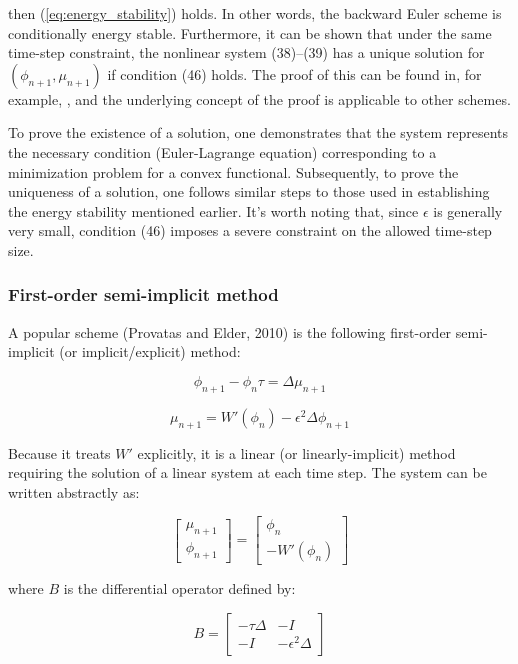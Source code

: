 \documentclass{article}
\begin{document}
then (\ref{eq:energy_stability}) holds. In other words, the backward Euler scheme is conditionally energy stable.
Furthermore, it can be shown that under the same time-step constraint, the nonlinear system (38)--(39) has a unique solution for $(\phi_{n+1}, \mu_{n+1})$ if condition (46) holds. The proof of this can be found in, for example, \cite{Elliott1989}, and the underlying concept of the proof is applicable to other schemes.

To prove the existence of a solution, one demonstrates that the system represents the necessary condition (Euler-Lagrange equation) corresponding to a minimization problem for a convex functional. Subsequently, to prove the uniqueness of a solution, one follows similar steps to those used in establishing the energy stability mentioned earlier. It's worth noting that, since $\epsilon$ is generally very small, condition (46) imposes a severe constraint on the allowed time-step size.
\subsubsection{First-order semi-implicit method}
A popular scheme (Provatas and Elder, 2010) is the following first-order semi-implicit (or implicit/explicit) method:

\begin{equation}
\phi_{n+1} - \phi_n \tau = \Delta \mu_{n+1} \label{eq:203}
\end{equation}

\begin{equation}
\mu_{n+1} = W'(\phi_n) - \epsilon^2 \Delta \phi_{n+1} \label{eq:204}
\end{equation}

Because it treats $W'$ explicitly, it is a linear (or linearly-implicit) method requiring the solution of a linear system at each time step. The system can be written abstractly as:

\begin{equation}
\begin{bmatrix}
\mu_{n+1} \\
\phi_{n+1}
\end{bmatrix}
=
\begin{bmatrix}
\phi_n \\
-W'(\phi_n)
\end{bmatrix} \label{eq:205}
\end{equation}

where $B$ is the differential operator defined by:

\begin{equation}
B =
\begin{bmatrix}
-\tau \Delta & -I \\
-I & -\epsilon^2\Delta
\end{bmatrix} \label{eq:206}
\end{equation}
\end{document}
